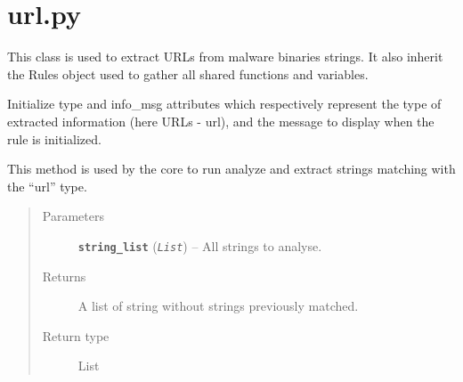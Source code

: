 \documentclass[letterpaper,10pt,oneside]{sphinxmanual}
\begin{document}
\section{url.py}
\label{index:module-lib.allRules.url}\label{index:url-py}

\begin{fulllineitems}
\label{index:lib.allRules.url.Url}
This class is used to extract URLs from malware
binaries strings. It also inherit the Rules object used to gather
all shared functions and variables.

\begin{fulllineitems}
\label{index:lib.allRules.url.Url.__init__}
Initialize type and info\_msg attributes which respectively represent
the type of extracted information (here URLs - url),
and the message to display when the rule is initialized.

\end{fulllineitems}


\begin{fulllineitems}
\label{index:lib.allRules.url.Url.run_analysis}
This method is used by the core to run analyze and extract strings
matching with the ``url'' type.
\begin{quote}\begin{description}
\item[{Parameters}] \leavevmode
\textbf{\texttt{string\_list}} (\emph{\texttt{List}}) -- All strings to analyse.

\item[{Returns}] \leavevmode
A list of string without strings previously matched.

\item[{Return type}] \leavevmode
List

\end{description}\end{quote}

\end{fulllineitems}


\end{fulllineitems}
\end{document}
